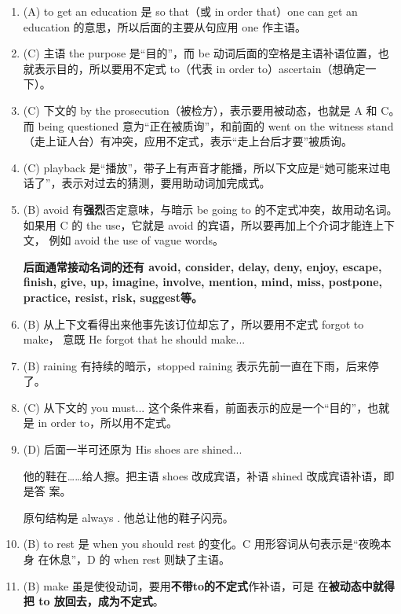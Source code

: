 \begin{enumerate}
\item (A) to get an education 是 so that（或 in order that）one can get an
  education 的意思，所以后面的主要从句应用 one 作主语。


\item (C) 主语 the purpose 是“目的”，而 be 动词后面的空格是主语补语位置，也
  就表示目的，所以要用不定式 to（代表 in order to）ascertain（想确定一下）。

\item (C) 下文的 by the prosecution（被检方），表示要用被动态，也就是 A 和 C。
  而 being questioned 意为“正在被质询”，和前面的 went on the witness
  stand（走上证人台）有冲突，应用不定式，表示“走上台后才要”被质询。

\item (C) playback 是“播放”，带子上有声音才能播，所以下文应是“她可能来过电
  话了”，表示对过去的猜测，要用助动词加完成式。

\item (B) avoid 有\textbf{强烈}否定意味，与暗示 be going to 的不定式冲突，故用动名词。
  如果用 C 的 the use，它就是 avoid 的宾语，所以要再加上个介词才能连上下文，
  例如 avoid the use of vague words。

  \textbf{后面通常接动名词的还有 avoid, consider, delay, deny, enjoy, escape,
    finish, give, up, imagine, involve, mention, mind, miss, postpone,
    practice, resist, risk, suggest等。}

\item (B) 从上下文看得出来他事先该订位却忘了，所以要用不定式 forgot to make，
  意既 He forgot that he should make...

\item (B) raining 有持续的暗示，stopped raining 表示先前一直在下雨，后来停了。

\item (C) 从下文的 you must... 这个条件来看，前面表示的应是一个“目的”，也就
  是 in order to，所以用不定式。

\item (D) 后面一半可还原为 His shoes are shined...

  他的鞋在……给人擦。把主语 shoes 改成宾语，补语 shined 改成宾语补语，即是答
  案。

  原句结构是  always  
  . 他总让他的鞋子闪亮。

\item (B) to rest 是 when you should rest 的变化。C 用形容词从句表示是“夜晚本身
  在休息”，D 的 when rest 则缺了主语。

\item (B) make 虽是使役动词，要用\textbf{不带to的不定式}作补语，可是
  在\textbf{被动态中就得把 to 放回去，成为不定式}。

\end{enumerate}


